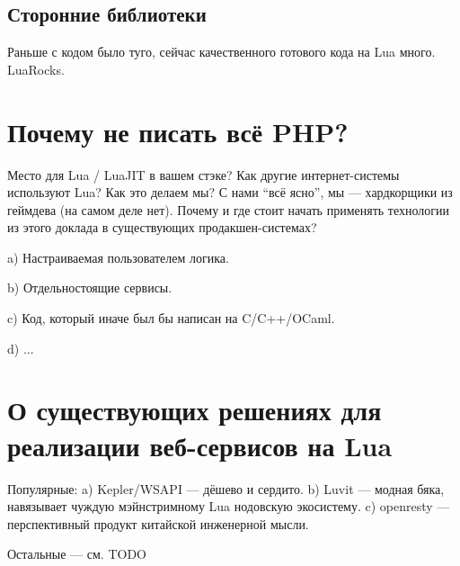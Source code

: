 \documentclass[aspectratio=169,handout]{beamer}
\begin{document}

\subsection*{Сторонние библиотеки}

\begin{frame}
  Раньше с кодом было туго, сейчас качественного готового кода на Lua много. LuaRocks.
\end{frame}


\section{Почему не писать всё PHP?}

\begin{frame}
Место для Lua / LuaJIT в вашем стэке? Как другие интернет-системы используют Lua? Как это делаем мы? С нами “всё ясно”, мы — хардкорщики из геймдева (на самом деле нет). Почему и где стоит начать применять технологии из этого доклада в существующих продакшен-системах?
\end{frame}

\begin{frame}
a) Настраиваемая пользователем логика.
\end{frame}

\begin{frame}
b) Отдельностоящие сервисы.
\end{frame}

\begin{frame}
c) Код, который иначе был бы написан на C/C++/OCaml.
\end{frame}

\begin{frame}
d) ...
\end{frame}


\section{О существующих решениях для реализации веб-сервисов на Lua}

\begin{frame}
Популярные:
a) Kepler/WSAPI — дёшево и сердито.
b) Luvit — модная бяка, навязывает чуждую мэйнстримному Lua нодовскую экосистему.
c) openresty — перспективный продукт китайской инженерной мысли.

Остальные — см. TODO
\end{frame}
\end{document}
